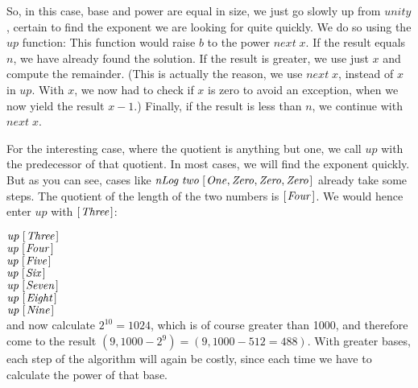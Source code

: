\documentclass{scrreprt}
\newcommand{\Conid}[1]{\mathit{#1}}
\newcommand{\Varid}[1]{\mathit{#1}}
\begin{document}
So, in this case, base and power are equal in size,
we just go slowly up from \ensuremath{\Varid{unity}},
certain to find the exponent we are looking for quite quickly.
We do so using the \ensuremath{\Varid{up}} function:
This function would raise \ensuremath{\Varid{b}} to the power \ensuremath{\Varid{next}\;\Varid{x}}.
If the result equals \ensuremath{\Varid{n}}, we have already found the solution.
If the result is greater, we use just \ensuremath{\Varid{x}} and compute the remainder.
(This is actually the reason, we use \ensuremath{\Varid{next}\;\Varid{x}}, instead of \ensuremath{\Varid{x}} in \ensuremath{\Varid{up}}.
 With \ensuremath{\Varid{x}}, we now had to check if \ensuremath{\Varid{x}} is zero to avoid
 an exception, when we now yield the result $x - 1$.)
Finally, if the result is less than \ensuremath{\Varid{n}}, we continue with \ensuremath{\Varid{next}\;\Varid{x}}.

For the interesting case,
where the quotient is anything but one,
we call \ensuremath{\Varid{up}} with the predecessor of that quotient.
In most cases, we will find the exponent quickly.
But as you can see, cases like \ensuremath{\Varid{nLog}\;\Varid{two}\;[\mskip1.5mu \Conid{One},\Conid{Zero},\Conid{Zero},\Conid{Zero}\mskip1.5mu]}
already take some steps.
The quotient of the length of the two numbers
is \ensuremath{[\mskip1.5mu \Conid{Four}\mskip1.5mu]}. We would hence enter \ensuremath{\Varid{up}} with \ensuremath{[\mskip1.5mu \Conid{Three}\mskip1.5mu]}:

\ensuremath{\Varid{up}\;[\mskip1.5mu \Conid{Three}\mskip1.5mu]}\\
\ensuremath{\Varid{up}\;[\mskip1.5mu \Conid{Four}\mskip1.5mu]}\\
\ensuremath{\Varid{up}\;[\mskip1.5mu \Conid{Five}\mskip1.5mu]}\\
\ensuremath{\Varid{up}\;[\mskip1.5mu \Conid{Six}\mskip1.5mu]}\\
\ensuremath{\Varid{up}\;[\mskip1.5mu \Conid{Seven}\mskip1.5mu]}\\
\ensuremath{\Varid{up}\;[\mskip1.5mu \Conid{Eight}\mskip1.5mu]}\\
\ensuremath{\Varid{up}\;[\mskip1.5mu \Conid{Nine}\mskip1.5mu]}\\

and now calculate $2^{10} = 1024$,
which is of course greater than \num{1000},
and therefore come to the result
$(9, 1000 - 2^9) = (9, 1000 - 512 = 488)$.
With greater bases,
each step of the algorithm will again be costly,
since each time we have to calculate the power
of that base.
\end{document}
